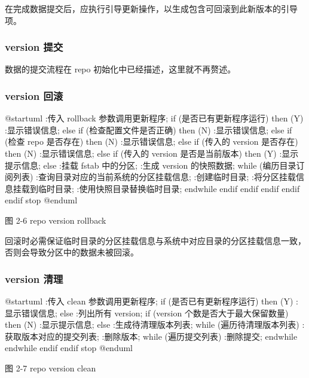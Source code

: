 \documentclass{utart}
\begin{document}
在完成数据提交后，应执行引导更新操作，以生成包含可回滚到此新版本的引导项。

\subsubsection{version 提交}
数据的提交流程在 repo 初始化中已经描述，这里就不再赘述。

\subsubsection{version 回滚}
\begin{center}
  \begin{adjustbox}{scale=0.75}
    \begin{plantuml}
      @startuml
      :传入 rollback 参数调用更新程序;
      if (是否已有更新程序运行) then (Y)
      :显示错误信息;
      else
      if (检查配置文件是否正确) then (N)
      :显示错误信息;
      else
      if (检查 repo 是否存在) then (N)
      :显示错误信息;
      else
      if (传入的 version 是否存在) then (N)
      :显示错误信息;
      else
      if (传入的 version 是否是当前版本) then (Y)
      :显示提示信息;
      else
      :挂载 fstab 中的分区;
      :生成 version 的快照数据;
      while (编历目录订阅列表)
      :查询目录对应的当前系统的分区挂载信息;
      :创建临时目录;
      :将分区挂载信息挂载到临时目录;
      :使用快照目录替换临时目录;
      endwhile
      endif
      endif
      endif
      endif
      endif
      stop
      @enduml
    \end{plantuml}
  \end{adjustbox}

  图 2-6 repo version rollback
\end{center}

回滚时必需保证临时目录的分区挂载信息与系统中对应目录的分区挂载信息一致，否则会导致分区中的数据未被回滚。

\subsubsection{version 清理}
\begin{center}
  \begin{adjustbox}{scale=0.65}
    \begin{plantuml}
      @startuml
      :传入 clean 参数调用更新程序;
      if (是否已有更新程序运行) then (Y)
      :显示错误信息;
      else
      :列出所有 version;
      if (version 个数是否大于最大保留数量) then (N)
      :显示提示信息;
      else
      :生成待清理版本列表;
      while (遍历待清理版本列表)
      :获取版本对应的提交列表;
      :删除版本;
      while (遍历提交列表)
      :删除提交;
      endwhile
      endwhile
      endif
      endif
      stop
      @enduml
    \end{plantuml}
  \end{adjustbox}

  图 2-7 repo version clean
\end{center}
\end{document}
